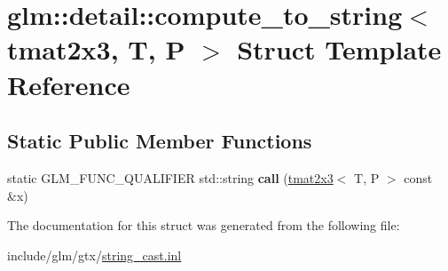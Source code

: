 \hypertarget{structglm_1_1detail_1_1compute__to__string_3_01tmat2x3_00_01T_00_01P_01_4}{}\section{glm\+:\+:detail\+:\+:compute\+\_\+to\+\_\+string$<$ tmat2x3, T, P $>$ Struct Template Reference}
\label{structglm_1_1detail_1_1compute__to__string_3_01tmat2x3_00_01T_00_01P_01_4}
\subsection*{Static Public Member Functions}
\begin{DoxyCompactItemize}
\item 
\mbox{\label{structglm_1_1detail_1_1compute__to__string_3_01tmat2x3_00_01T_00_01P_01_4_a69b0cc0650365f45aaf4c5aba6819abc}} 
static G\+L\+M\+\_\+\+F\+U\+N\+C\+\_\+\+Q\+U\+A\+L\+I\+F\+I\+ER std\+::string {\bfseries call} (\hyperlink{structglm_1_1tmat2x3}{tmat2x3}$<$ T, P $>$ const \&x)
\end{DoxyCompactItemize}


The documentation for this struct was generated from the following file\+:\begin{DoxyCompactItemize}
\item 
include/glm/gtx/\hyperlink{string__cast_8inl}{string\+\_\+cast.\+inl}\end{DoxyCompactItemize}
